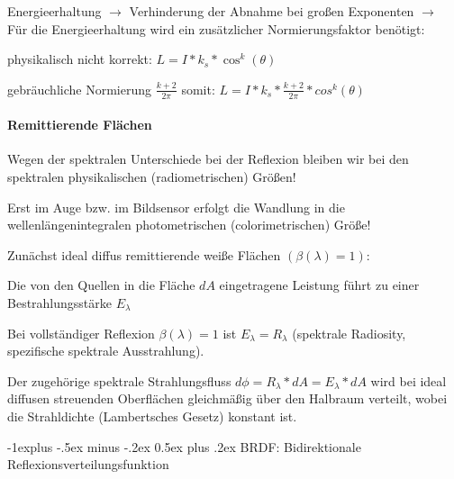 \documentclass[landscape]{article}
\makeatletter
\renewcommand{\subsection}{\@startsection{subsection}{2}{0mm}%
                                {-1explus -.5ex minus -.2ex}%
                                {0.5ex plus .2ex}%
                                {\normalfont\normalsize\bfseries}}
\makeatother
\begin{document}
\begin{multicols}{3}
  Energieerhaltung $\rightarrow$ Verhinderung der Abnahme bei großen Exponenten $\rightarrow$ Für die Energieerhaltung wird ein zusätzlicher Normierungsfaktor benötigt:
  \begin{itemize*}
    \item physikalisch nicht korrekt:  $L=I*k_s*\cos^k(\theta)$
    \item gebräuchliche Normierung $\frac{k+2}{2\pi}$ somit: $L=I*k_s*\frac{k+2}{2\pi}*cos^k(\theta)$
  \end{itemize*}
  
  \paragraph{Remittierende Flächen}
  \begin{itemize*}
    \item Wegen der spektralen Unterschiede bei der Reflexion bleiben wir bei den spektralen physikalischen (radiometrischen) Größen!
    \item Erst im Auge bzw. im Bildsensor erfolgt die Wandlung in die wellenlängenintegralen photometrischen (colorimetrischen) Größe!
  \end{itemize*}
  
  Zunächst ideal diffus remittierende weiße Flächen $(\beta(\lambda) = 1)$:
  \begin{itemize*}
    \item Die von den Quellen in die Fläche $dA$ eingetragene Leistung führt zu einer Bestrahlungsstärke $E_{\lambda}$
    \item Bei vollständiger Reflexion $\beta(\lambda) = 1$ ist $E_{\lambda} = R_{\lambda}$ (spektrale Radiosity, spezifische spektrale Ausstrahlung).
    \item Der zugehörige spektrale Strahlungsfluss $d\phi = R_{\lambda} * dA = E_{\lambda} * dA$ wird bei ideal diffusen streuenden Oberflächen gleichmäßig über den Halbraum verteilt, wobei die Strahldichte (Lambertsches Gesetz) konstant ist.
  \end{itemize*}
  
  
  \subsection{ BRDF: Bidirektionale Reflexionsverteilungsfunktion}

\end{multicols}
\end{document}
